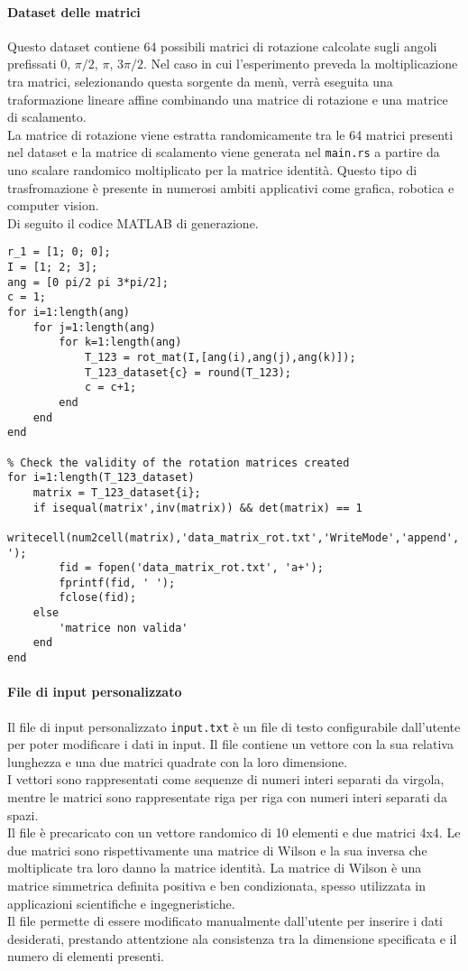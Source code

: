 \paragraph{Dataset delle matrici}
Questo dataset contiene 64 possibili matrici di rotazione calcolate sugli angoli prefissati 0, \(\pi/2\), \(\pi\), \(3\pi/2\).
Nel caso in cui l'esperimento preveda la moltiplicazione tra matrici, selezionando questa sorgente da menù, verrà eseguita una traformazione lineare affine combinando una matrice di rotazione e una matrice di scalamento.\\
La matrice di rotazione viene estratta randomicamente tra le 64 matrici presenti nel dataset e la matrice di scalamento viene generata nel \texttt{main.rs} a partire da uno scalare randomico moltiplicato per la matrice identità.
Questo tipo di trasfromazione è presente in numerosi ambiti applicativi come grafica, robotica e computer vision.\\
Di seguito il codice MATLAB di generazione.

\begin{verbatim}
r_1 = [1; 0; 0];
I = [1; 2; 3];
ang = [0 pi/2 pi 3*pi/2];
c = 1;
for i=1:length(ang)
    for j=1:length(ang)
        for k=1:length(ang) 
            T_123 = rot_mat(I,[ang(i),ang(j),ang(k)]);
            T_123_dataset{c} = round(T_123);
            c = c+1;
        end
    end
end

% Check the validity of the rotation matrices created
for i=1:length(T_123_dataset)
    matrix = T_123_dataset{i};
    if isequal(matrix',inv(matrix)) && det(matrix) == 1
        writecell(num2cell(matrix),'data_matrix_rot.txt','WriteMode','append','Delimiter',' ');
        fid = fopen('data_matrix_rot.txt', 'a+');
        fprintf(fid, ' ');
        fclose(fid);
    else
        'matrice non valida'
    end
end
\end{verbatim}

\paragraph{File di input personalizzato}
Il file di input personalizzato \texttt{input.txt} è un file di testo configurabile dall'utente per poter modificare i dati in input. Il file contiene un vettore con la sua relativa lunghezza e una due matrici quadrate con la loro dimensione. \\
I vettori sono rappresentati come sequenze di numeri interi separati da virgola, mentre le matrici sono rappresentate riga per riga con numeri interi separati da spazi.\\
Il file è precaricato con un vettore randomico di 10 elementi e due matrici 4x4. Le due matrici sono rispettivamente una matrice di Wilson e la sua inversa che moltiplicate tra loro danno la matrice identità. La matrice di Wilson è una matrice simmetrica definita positiva e ben condizionata, spesso utilizzata in applicazioni scientifiche e ingegneristiche. \\
Il file permette di essere modificato manualmente dall'utente per inserire i dati desiderati, prestando attentzione ala consistenza tra la dimensione specificata e il numero di elementi presenti.\\

